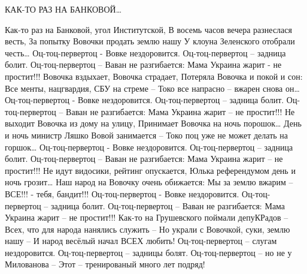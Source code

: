  
 
 
 
 
КАК-ТО РАЗ НА БАНКОВОЙ…

Как-то раз на Банковой, угол Институтской,
В восемь часов вечера разнеслася весть,
За попытку Вовочки продать землю нашу
У клоуна Зеленского отобрали честь…
Оц-тоц-первертоц - Вовке нездоровится.
Оц-тоц-первертоц – задница болит.
Оц-тоц-первертоц – Ваван не разгибается:
Мама Украина жарит - не простит!!!
Вовочка вздыхает, Вовочка страдает,
Потеряла Вовочка и покой и сон:
Все менты, нацгвардия, СБУ на стреме –
Токо все напрасно – вжарен снова он…
Оц-тоц-первертоц - Вовке нездоровится.
Оц-тоц-первертоц – задница болит.
Оц-тоц-первертоц – Ваван не разгибается:
Мама Украина жарит – не простит!!!
Не выходит Вовочка из дому на улицу,
Принимает Вовочка на ночь порошок…
День и ночь министр Ляшко Вовой занимается –
Токо поц уже не может делать на горшок…
Оц-тоц-первертоц - Вовке нездоровится.
Оц-тоц-первертоц – задница болит.
Оц-тоц-первертоц – Ваван не разгибается:
Мама Украина жарит – не простит!!!
Не идут видосики, рейтинг опускается,
Юлька референдумом день и ночь грозит…
Наш народ на Вовочку очень обижается:
Мы за землю вжарим – ВСЕ!!! - тебя, бандит!!!
Оц-тоц-первертоц - Вовке нездоровится.
Оц-тоц-первертоц – задница болит.
Оц-тоц-первертоц – Ваван не разгибается:
Мама Украина жарит – не простит!!!
Как-то на Грушевского поймали депуКРадов –
Всех, что для народа нанялись служить –
Но украли с Вовочкой, суки, землю нашу –
И народ весёлый начал ВСЕХ любить!
Оц-тоц-первертоц – слугам нездоровится.
Оц-тоц-первертоц – задницы болят.
Оц-тоц-первертоц – но не у Милованова –
Этот – тренированый много лет подряд!
